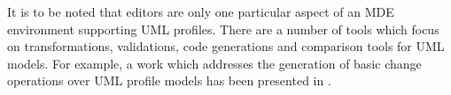 It is to be noted that editors are only one particular aspect of an MDE environment supporting UML profiles. 
There are a number of tools which focus on transformations, validations, code generations and comparison tools for UML models. 
For example, a work which addresses the generation of basic change operations over UML profile models has been presented in \cite{kelter2008comparing, alanen2005subset}.



